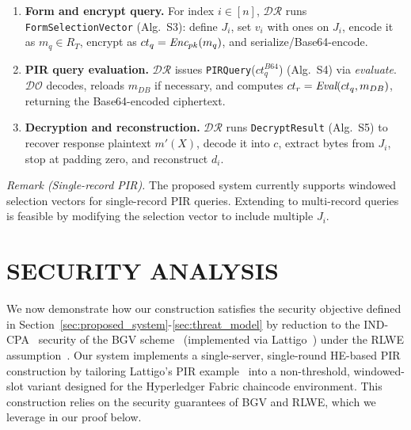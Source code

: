 \documentclass{ieeetj}
\begin{document}
\begin{enumerate}
    \item \textbf{Form and encrypt query.}  
    For index $i\in[n]$, $\mathcal{DR}$ runs \texttt{FormSelectionVector} (Alg.~S3): 
    define $J_i$, set ${v}_i$ with ones on $J_i$, encode it as $m_q\in R_T$, encrypt as $ct_q=\emph{Enc}_{pk}(m_q)$,
    and serialize/Base64-encode. 

    \item \textbf{PIR query evaluation.}  
    $\mathcal{DR}$ issues \texttt{PIRQuery}($ct_q^{B64}$) (Alg.~S4) via \emph{evaluate}. 
    $\mathcal{DO}$ decodes, reloads \emph{$m_{DB}$} if necessary, and computes 
    $ct_r=\emph{Eval}(ct_q,\emph{$m_{DB}$})$, returning the Base64-encoded ciphertext.   

    \item \textbf{Decryption and reconstruction.}  
    $\mathcal{DR}$ runs \texttt{DecryptResult} (Alg.~S5) to recover response plaintext $m'(X)$, decode it into $c$,
    extract bytes from $J_i$, stop at padding zero, and reconstruct $d_i$.

\end{enumerate}

\noindent\textit{Remark (Single-record PIR).}
The proposed system currently supports windowed selection vectors for single-record PIR queries.
Extending to multi-record queries is feasible by modifying the selection vector to include multiple $J_i$.

\section{SECURITY ANALYSIS}\label{sec:security}
We now demonstrate how our construction satisfies the security objective defined in Section~\ref{sec:proposed_system}-\ref{sec:threat_model}
by reduction to the IND-CPA~\cite{noauthor_ciphertext_2025} security of the BGV scheme~\cite{cryptoeprint:2011/277} 
(implemented via Lattigo~\cite{noauthor_lattigo_2024}) under the RLWE assumption~\cite{peikert_lattice_2014}. 
Our system implements a single-server, single-round HE-based PIR construction by tailoring
Lattigo's PIR example~\cite{noauthor_lattigoexamples_nodate} into a non-threshold, 
windowed-slot variant designed for the Hyperledger Fabric chaincode environment.
This construction relies on the security guarantees of BGV and RLWE, which we leverage in our proof below.
\end{document}
